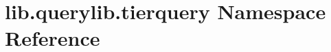 \hypertarget{namespacelib_1_1querylib_1_1tierquery}{\section{lib.\-querylib.\-tierquery Namespace Reference}
\label{namespacelib_1_1querylib_1_1tierquery}
}
